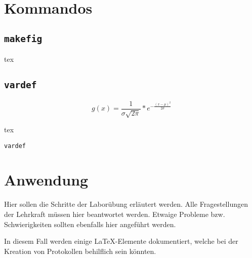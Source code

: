 \newpage
\section{Kommandos}\label{sec:Kommandos}
\subsection{\texttt{makefig}}

\begin{code}{tex}
\end{code}

\subsection{\texttt{vardef}}
$$g(x) = \frac{1}{\sigma\sqrt{2\pi}} * e^{-\frac{(x-\mu)^2}{2\sigma}}$$
\begin{listing}[H]
\begin{code}[firstnumber=last]{tex}
\begin{vardef}
\end{vardef}
\end{code}
\caption{\texttt{vardef}}
\label{lst:vardef}
\end{listing}

\begin{vardef}
\end{vardef}

\newpage
\section{Anwendung}\label{sec:Anwendung}
Hier sollen die Schritte der Laborübung erläutert werden. Alle Fragestellungen der Lehrkraft müssen hier beantwortet werden. Etwaige Probleme bzw. Schwierigkeiten sollten ebenfalls hier angeführt werden.

In diesem Fall werden einige \LaTeX-Elemente dokumentiert, welche bei der Kreation von Protokollen behilflich sein könnten.

